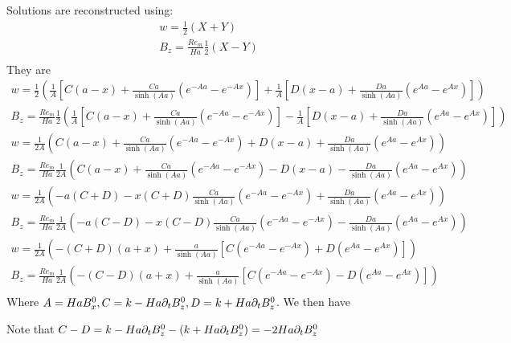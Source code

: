 \documentclass[11pt]{article}
\begin{document}
Solutions are reconstructed using:
\begin{equation}\begin{aligned}
w   =                 \frac{1}{2} (X + Y)\\
B_z = \frac{Re_m}{Ha} \frac{1}{2} (X - Y)\\
\end{aligned} \end{equation}
They are
\begin{equation}\begin{aligned}
w   =                 \frac{1}{2} \left( \frac{1}{A} \left[ C(a-x) + \frac{Ca}{\sinh(Aa)}(e^{-A a}-e^{-Ax}) \right] + \frac{1}{A} \left[ D(x-a) + \frac{Da}{\sinh(Aa)}(e^{ A a}-e^{ Ax}) \right] \right)\\
B_z = \frac{Re_m}{Ha} \frac{1}{2} \left( \frac{1}{A} \left[ C(a-x) + \frac{Ca}{\sinh(Aa)}(e^{-A a}-e^{-Ax}) \right] - \frac{1}{A} \left[ D(x-a) + \frac{Da}{\sinh(Aa)}(e^{ A a}-e^{ Ax}) \right] \right)\\
w   =                 \frac{1}{2A} \left( C(a-x) + \frac{Ca}{\sinh(Aa)}(e^{-A a}-e^{-Ax}) + D(x-a) + \frac{Da}{\sinh(Aa)}(e^{ A a}-e^{ Ax}) \right)\\
B_z = \frac{Re_m}{Ha} \frac{1}{2A} \left( C(a-x) + \frac{Ca}{\sinh(Aa)}(e^{-A a}-e^{-Ax}) - D(x-a) - \frac{Da}{\sinh(Aa)}(e^{ A a}-e^{ Ax}) \right)\\
w   =                 \frac{1}{2A} \left( -a(C+D)-x(C+D) \frac{Ca}{\sinh(Aa)}(e^{-A a}-e^{-Ax}) + \frac{Da}{\sinh(Aa)}(e^{ A a}-e^{ Ax}) \right)\\
B_z = \frac{Re_m}{Ha} \frac{1}{2A} \left( -a(C-D)-x(C-D) \frac{Ca}{\sinh(Aa)}(e^{-A a}-e^{-Ax}) - \frac{Da}{\sinh(Aa)}(e^{ A a}-e^{ Ax}) \right)\\
w   =                 \frac{1}{2A} \left(-(C+D)(a+x)+ \frac{a}{\sinh(Aa)} \left[C(e^{-A a}-e^{-Ax}) + D(e^{ A a}-e^{ Ax})\right] \right)\\
B_z = \frac{Re_m}{Ha} \frac{1}{2A} \left(-(C-D)(a+x)+ \frac{a}{\sinh(Aa)} \left[C(e^{-A a}-e^{-Ax}) - D(e^{ A a}-e^{ Ax})\right] \right)\\
\end{aligned} \end{equation}
Where $A = Ha B_x^0, C = k - Ha \partial_t B_z^0, D = k + Ha \partial_t B_z^0$. We then have

Note that
$C-D = k - Ha \partial_t B_z^0 - (k + Ha \partial_t B_z^0) = -2Ha \partial_t B_z^0$
\end{document}
